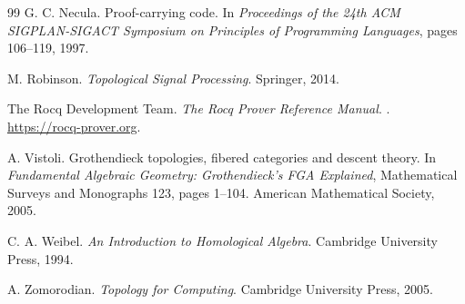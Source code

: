 \documentclass[11pt]{article}
\begin{document}
\begin{thebibliography}{99}
G. C. Necula.
\newblock Proof-carrying code.
\newblock In \emph{Proceedings of the 24th ACM SIGPLAN-SIGACT Symposium on Principles of Programming Languages}, pages 106--119, 1997.

M. Robinson.
\newblock \emph{Topological Signal Processing}.
\newblock Springer, 2014.

The Rocq Development Team.
\newblock \emph{The Rocq Prover Reference Manual}.
. \url{https://rocq-prover.org}.

A. Vistoli.
\newblock Grothendieck topologies, fibered categories and descent theory.
\newblock In \emph{Fundamental Algebraic Geometry: Grothendieck's FGA Explained}, Mathematical Surveys and Monographs 123, pages 1--104. American Mathematical Society, 2005.

C. A. Weibel.
\newblock \emph{An Introduction to Homological Algebra}.
\newblock Cambridge University Press, 1994.

A. Zomorodian.
\newblock \emph{Topology for Computing}.
\newblock Cambridge University Press, 2005.

\end{thebibliography}
\end{document}
